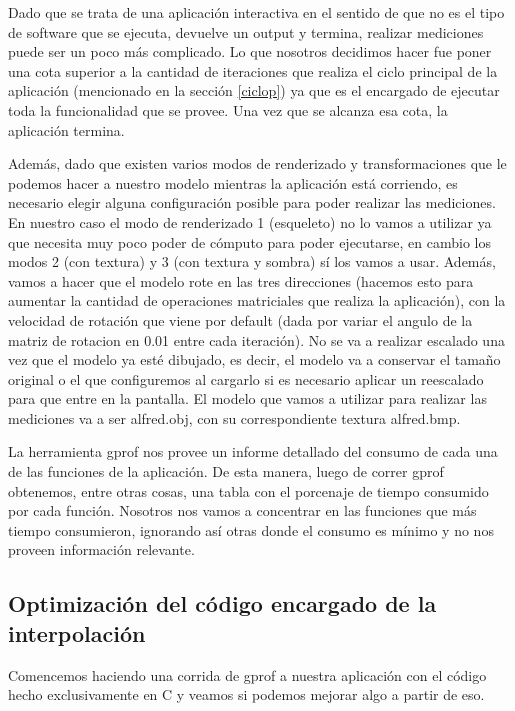 \documentclass[a4paper]{article}
\begin{document}
Dado que se trata de una aplicación interactiva en el sentido de que no es el tipo de software que se ejecuta, devuelve un output y termina, realizar mediciones puede ser un poco más complicado. Lo que nosotros decidimos hacer fue poner una cota superior a la cantidad de iteraciones que realiza el ciclo principal de la aplicación (mencionado en la sección \ref{ciclop}) ya que es el encargado de ejecutar toda la funcionalidad que se provee. Una vez que se alcanza esa cota, la aplicación termina.

Además, dado que existen varios modos de renderizado y transformaciones que le podemos hacer a nuestro modelo mientras la aplicación está corriendo, es necesario elegir alguna configuración posible para poder realizar las mediciones. En nuestro caso el modo de renderizado 1 (esqueleto) no lo vamos a utilizar ya que necesita muy poco poder de cómputo para poder ejecutarse, en cambio los modos 2 (con textura) y 3 (con textura y sombra) sí los vamos a usar. Además, vamos a hacer que el modelo rote en las tres direcciones (hacemos esto para aumentar la cantidad de operaciones matriciales que realiza la aplicación), con la velocidad de rotación que viene por default (dada por variar el angulo de la matriz de rotacion en 0.01 entre cada iteración). No se va a realizar escalado una vez que el modelo ya esté dibujado, es decir, el modelo va a conservar el tamaño original o el que configuremos al cargarlo si es necesario aplicar un reescalado para que entre en la pantalla. El modelo que vamos a utilizar para realizar las mediciones va a ser alfred.obj, con su correspondiente textura alfred.bmp.

La herramienta gprof nos provee un informe detallado del consumo de cada una de las funciones de la aplicación. De esta manera, luego de correr gprof obtenemos, entre otras cosas, una tabla con el porcenaje de tiempo consumido por cada función. Nosotros nos vamos a concentrar en las funciones que más tiempo consumieron, ignorando así otras donde el consumo es mínimo y no nos proveen información relevante.

\subsection{Optimización del código encargado de la interpolación}
Comencemos haciendo una corrida de gprof a nuestra aplicación con el código hecho exclusivamente en C y veamos si podemos mejorar algo a partir de eso. 
\end{document}
